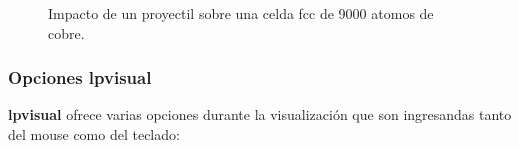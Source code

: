 \begin{figure}[h!]
 \centering
 \label{fig:lpvisual2}
 \caption{Impacto de un proyectil sobre una celda fcc de 9000 atomos de cobre.}
\end{figure}


\newpage
\subsubsection{Opciones lpvisual}
{\bf lpvisual} ofrece varias opciones durante la visualizaci\'on que son ingresandas tanto del mouse como del teclado:\\

